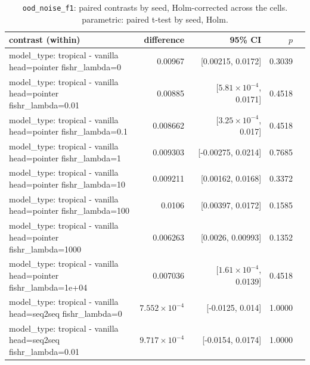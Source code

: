 \documentclass[10pt]{article}
\makeatletter
\newcommand{\stackcell}[1]{\begin{tabular}[t]{@{}l@{}}#1\end{tabular}}
\makeatother
\begin{document}
{\small
\begin{longtable}{lrrrl}
\caption{\texttt{ood\_noise\_f1}: paired contrasts by seed, Holm-corrected across the cells. parametric: paired t-test by seed, Holm.}\label{tab:paired-ood_noise_f1}\\
\toprule
contrast (within) & difference & 95\% CI & $p$ & \\
\midrule
\endhead
\stackcell{model\_type: tropical - vanilla\\\footnotesize head=pointer fishr\_lambda=0 } & 0.00967 & [0.00215, 0.0172] & 0.3039 & \\
\stackcell{model\_type: tropical - vanilla\\\footnotesize head=pointer fishr\_lambda=0.01 } & 0.00885 & [$5.81\times10^{-4}$, 0.0171] & 0.4518 & \\
\stackcell{model\_type: tropical - vanilla\\\footnotesize head=pointer fishr\_lambda=0.1 } & 0.008662 & [$3.25\times10^{-4}$, 0.017] & 0.4518 & \\
\stackcell{model\_type: tropical - vanilla\\\footnotesize head=pointer fishr\_lambda=1 } & 0.009303 & [-0.00275, 0.0214] & 0.7685 & \\
\stackcell{model\_type: tropical - vanilla\\\footnotesize head=pointer fishr\_lambda=10 } & 0.009211 & [0.00162, 0.0168] & 0.3372 & \\
\stackcell{model\_type: tropical - vanilla\\\footnotesize head=pointer fishr\_lambda=100 } & 0.0106 & [0.00397, 0.0172] & 0.1585 & \\
\stackcell{model\_type: tropical - vanilla\\\footnotesize head=pointer fishr\_lambda=1000 } & 0.006263 & [0.0026, 0.00993] & 0.1352 & \\
\stackcell{model\_type: tropical - vanilla\\\footnotesize head=pointer fishr\_lambda=1e+04 } & 0.007036 & [$1.61\times10^{-4}$, 0.0139] & 0.4518 & \\
\stackcell{model\_type: tropical - vanilla\\\footnotesize head=seq2seq fishr\_lambda=0 } & $7.552\times10^{-4}$ & [-0.0125, 0.014] & 1.0000 & \\
\stackcell{model\_type: tropical - vanilla\\\footnotesize head=seq2seq fishr\_lambda=0.01 } & $9.717\times10^{-4}$ & [-0.0154, 0.0174] & 1.0000 & \\

\end{longtable}}
\end{document}
